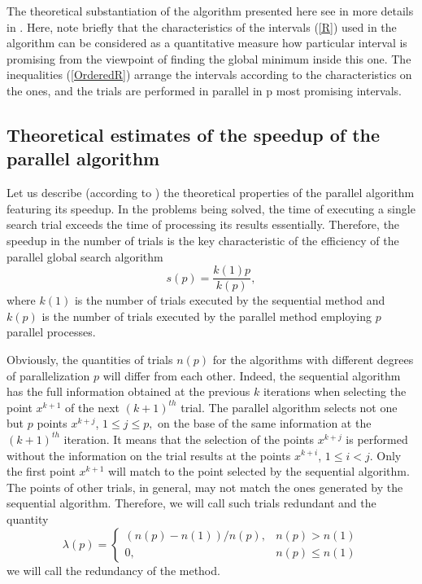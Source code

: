 \documentclass[runningheads]{llncs}
\begin{document}
The theoretical substantiation of the algorithm presented here see in more details in \cite{Strongin2000}. Here, note briefly that the characteristics of the intervals (\ref{R}) used in the algorithm can be considered as a quantitative measure how particular interval is promising from the viewpoint of finding the global minimum inside this one. The inequalities (\ref{OrderedR}) arrange the intervals according to the characteristics on the ones, and the trials are performed in parallel in p most promising intervals.

\subsection{Theoretical estimates of the speedup of the parallel algorithm}
Let us describe (according to \cite{Strongin2000}) the theoretical properties of the parallel algorithm featuring its speedup. In the problems being solved, the time of executing a single search trial exceeds the time of processing its results essentially. Therefore, the speedup in the number of trials is the key characteristic of the efficiency of the parallel global search algorithm
\begin{equation} \label{par_trl_ref}
s(p) = \frac{k(1)p}{k(p)},
\end{equation}
where $k(1)$ is the number of trials executed by the sequential method and $k(p)$ is the number of trials executed by the parallel method employing $p$ parallel processes.

Obviously, the quantities of trials $n(p)$ for the algorithms with different degrees of parallelization $p$ will differ from each other. Indeed, the sequential algorithm has the full information obtained at the previous $k$ iterations when selecting the point $x^{k+1}$ of the next $(k+1)^{th}$ trial. The parallel algorithm selects not one but $p$ points $x^{k+j}$, $1 \leq j \leq p,$ on the base of the same information at the $(k+1)^{th}$ iteration. It means that the selection of the points $x^{k+j}$ is performed without the information on the trial results at the points $x^{k+i}$, $1 \leq i < j$. Only the first point $x^{k+1}$ will match to the point selected by the sequential algorithm. The points of other trials, in general, may not match the ones generated by the sequential algorithm. Therefore, we will call such trials redundant and the quantity
\begin{displaymath}
\lambda(p) = \left\{ \begin{array}{ll}
                (n(p) - n(1)) / n(p), & \textrm{$n(p) > n(1)$}\\
                0, & \textrm{$n(p) \leq n(1)$}
  \end{array} \right.
\end{displaymath}
we will call the redundancy of the method.
\end{document}
